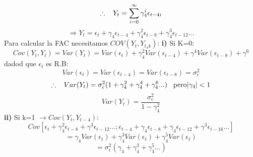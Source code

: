 \documentclass[12pt,letterpaper]{article}
\begin{document}
\begin{enumerate}
\begin{equation*}
    \end{equation*}
    \begin{equation*}
        \therefore \hspace{3mm} Y_t = \sum_{i=0}^\infty \gamma_4^i\epsilon_{t-4i}
    \end{equation*}
    \begin{equation*}
        \Rightarrow Y_t = \epsilon_t + \gamma_4\epsilon_{t-4}+ \gamma^2_4\epsilon_{t-8}+\gamma^3_4\epsilon_{t-12}...
    \end{equation*}
    Para calcular la FAC necesitamos $COV(Y_t,Y_{t_4k})$:
    \newline
    \newline
    \textbf{i)} Si K=0:
    \begin{equation*}
        Cov(Y_t,Y_t) = Var(Y_t) = Var(\epsilon_t)+\gamma_4^2Var(\epsilon_{t-4})+\gamma^4Var(\epsilon_{t-8})+ \gamma^6
    \end{equation*}
    dadod que $\epsilon_t$ es R.B:
    \begin{equation*}
        Var(\epsilon_t) = Var(\epsilon_{t-4})= Var(\epsilon_{t-8}) = \sigma_{\epsilon}^2
    \end{equation*}
    \begin{equation*}
        \therefore \hspace{3mm} Var(Y_t) = \sigma^2_{\epsilon}(1+\gamma_4^2+\gamma_4^4+\gamma_4^6...) \hspace{3mm} \text{pero} |\gamma_4|<1
    \end{equation*}
    \begin{equation*}
        Var(Y_t) = \frac{\sigma_{\epsilon}^2}{1-\gamma_4^2}
    \end{equation*}
    \newline
    \newline
    \textbf{ii)} Si k=1 $\rightarrow Cov(Y_t,Y_{t-4})$:
    \begin{equation*}
        Cov\left[\epsilon_t+\gamma_4^2\epsilon_{t-8}+\gamma^3\epsilon_{t-12}... ; \epsilon_{t-4} + \gamma_4\epsilon_{t-8}+\gamma_4\epsilon_{t-12}+\gamma^3\epsilon_{t-16}...  \right]
    \end{equation*}
    \begin{equation*}
        = \gamma_4Var(\epsilon_t)+\gamma_4^3Var(\epsilon_t)+ \gamma_4^5Var(\epsilon_t)
    \end{equation*}
    \begin{equation*}
        = \sigma_{\epsilon}^2(\gamma_4+\gamma_4^3+\gamma_4^5...)
    \end{equation*}

\end{enumerate}
\end{document}
